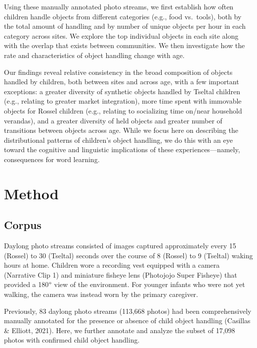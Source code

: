 \documentclass[10pt, letterpaper]{article}
\begin{document}
Using these manually annotated photo streams, we first establish how
often children handle objects from different categories (e.g., food
vs.~tools), both by the total amount of handling and by number of unique
objects per hour in each category across sites. We explore the top
individual objects in each site along with the overlap that exists
between communities. We then investigate how the rate and
characteristics of object handling change with age.

Our findings reveal relative consistency in the broad composition of
objects handled by children, both between sites and across age, with a
few important exceptions: a greater diversity of synthetic objects
handled by Tseltal children (e.g., relating to greater market
integration), more time spent with immovable objects for Rossel children
(e.g., relating to socializing time on/near household verandas), and a
greater diversity of held objects and greater number of transitions
between objects across age. While we focus here on describing the
distributional patterns of children's object handling, we do this with
an eye toward the cognitive and linguistic implications of these
experiences---namely, consequences for word learning.

\hypertarget{method}{%
\section{Method}\label{method}}

\hypertarget{corpus}{%
\subsection{Corpus}\label{corpus}}

Daylong photo streams consisted of images captured approximately every
15 (Rossel) to 30 (Tseltal) seconds over the course of 8 (Rossel) to 9
(Tseltal) waking hours at home. Children wore a recording vest equipped
with a camera (Narrative Clip 1) and miniature fisheye lens (Photojojo
Super Fisheye) that provided a 180\(\text{\textdegree}\) view of the
environment. For younger infants who were not yet walking, the camera
was instead worn by the primary caregiver.

Previously, 83 daylong photo streams (113,668 photos) had been
comprehensively manually annotated for the presence or absence of child
object handling (Casillas \& Elliott, 2021). Here, we further annotate
and analyze the subset of 17,098 photos with confirmed child object
handling.
\end{document}
